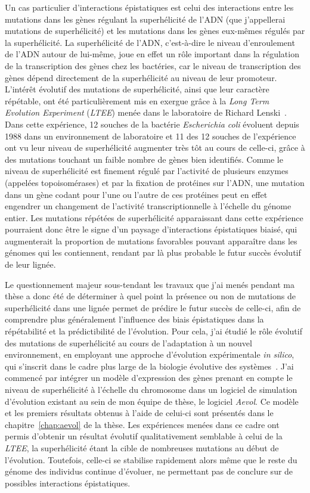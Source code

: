 Un cas particulier d'interactions épistatiques est celui des interactions entre les mutations dans les gènes régulant la superhélicité de l'ADN (que j'appellerai mutations de superhélicité) et les mutations dans les gènes eux-mêmes régulés par la superhélicité.
La superhélicité de l'ADN, c'est-à-dire le niveau d'enroulement de l'ADN autour de lui-même, joue en effet un rôle important dans la régulation de la transcription des gènes chez les bactéries, car le niveau de transcription des gènes dépend directement de la superhélicité au niveau de leur promoteur.
L'intérêt évolutif des mutations de superhélicité, ainsi que leur caractère répétable, ont été particulièrement mis en exergue grâce à la \emph{Long Term Evolution Experiment} (\emph{LTEE}) menée dans le laboratoire de Richard Lenski~\citep{lenski1991}.
Dans cette expérience, 12 souches de la bactérie \emph{Escherichia coli} évoluent depuis 1988 dans un environnement de laboratoire et 11 des 12 souches de l'expérience ont vu leur niveau de superhélicité augmenter très tôt au cours de celle-ci, grâce à des mutations touchant un faible nombre de gènes bien identifiés.
Comme le niveau de superhélicité est finement régulé par l'activité de plusieurs enzymes (appelées topoisomérases) et par la fixation de protéines sur l'ADN, une mutation dans un gène codant pour l'une ou l'autre de ces protéines peut en effet engendrer un changement de l'activité transcriptionnelle à l'échelle du génome entier.
Les mutations répétées de superhélicité apparaissant dans cette expérience pourraient donc être le signe d'un paysage d'interactions épistatiques biaisé, qui augmenterait la proportion de mutations favorables pouvant apparaître dans les génomes qui les contiennent, rendant par là plus probable le futur succès évolutif de leur lignée.

Le questionnement majeur sous-tendant les travaux que j'ai menés pendant ma thèse a donc été de déterminer à quel point la présence ou non de mutations de superhélicité dans une lignée permet de prédire le futur succès de celle-ci, afin de comprendre plus généralement l'influence des biais épistatiques dans la répétabilité et la prédictibilité de l'évolution.
Pour cela, j'ai étudié le rôle évolutif des mutations de superhélicité au cours de l'adaptation à un nouvel environnement, en employant une approche d'évolution expérimentale \emph{in silico}, qui s'inscrit dans le cadre plus large de la biologie évolutive des systèmes~\citep{beslon2021}.
J'ai commencé par intégrer un modèle d'expression des gènes prenant en compte le niveau de superhélicité à l'échelle du chromosome dans un logiciel de simulation d'évolution existant au sein de mon équipe de thèse, le logiciel \emph{Aevol}.
Ce modèle et les premiers résultats obtenus à l'aide de celui-ci sont présentés dans le chapitre~\ref{chap:aevol} de la thèse.
Les expériences menées dans ce cadre ont permis d'obtenir un résultat évolutif qualitativement semblable à celui de la \emph{LTEE}, la superhélicité étant la cible de nombreuses mutations au début de l'évolution.
Toutefois, celle-ci se stabilise rapidement alors même que le reste du génome des individus continue d'évoluer, ne permettant pas de conclure sur de possibles interactions épistatiques.

